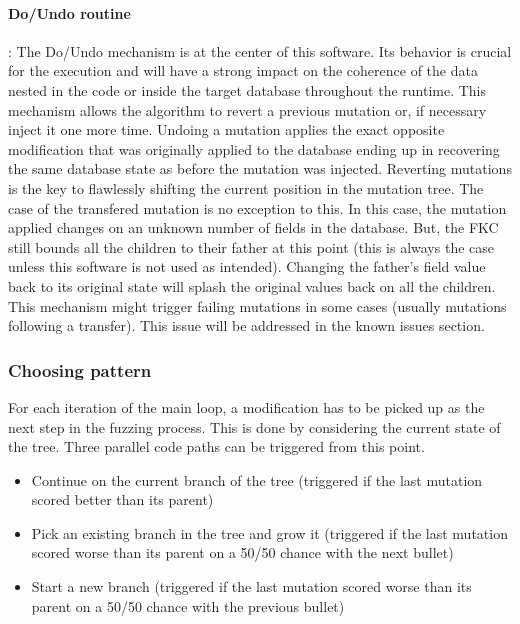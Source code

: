 \documentclass{article}
\begin{document}
\begin{empfile}
				\paragraph{Do/Undo routine} :
The Do/Undo mechanism is at the center of this software. Its behavior is crucial for the execution and will have a strong impact on the coherence of the data nested in the code or inside the target database throughout the runtime.
This mechanism allows the algorithm to revert a previous mutation or, if necessary inject it one more time. 
Undoing a mutation applies the exact opposite modification that was originally applied to the database ending up in recovering the same database state as before the mutation was injected.
Reverting mutations is the key to flawlessly shifting the current position in the mutation tree.
The case of the transfered mutation is no exception to this. In this case, the mutation applied changes on an unknown number of fields in the database. But, the FKC still bounds all the children to their father at this point (this is always the case unless this software is not used as intended).  
Changing the father's field value back to its original state will splash the original values back on all the children.
This mechanism might trigger failing mutations in some cases (usually mutations following a transfer). This issue will be addressed in the known issues section. 

				\subsubsection{Choosing pattern}
For each iteration of the main loop, a modification has to be picked up as the next step in the fuzzing process. This is done by considering the current state of the tree.
Three parallel code paths can be triggered from this point.
				\begin{itemize}
				\item{Continue on the current branch of the tree (triggered if the last mutation scored better than its parent)}
				\item{Pick an existing branch in the tree and grow it (triggered if the last mutation scored worse than its parent on a 50/50 chance with the next bullet)}
				\item{Start a new branch (triggered if the last mutation scored worse than its parent on a 50/50 chance with the previous bullet)}
				\end{itemize}				
				

\end{empfile}
\end{document}
